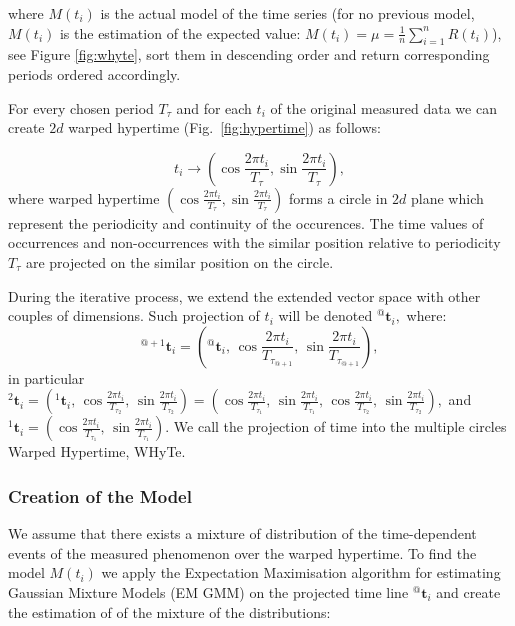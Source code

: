 \noindent where $M\left(t_{i}\right)$ is the actual model of the time series (for no previous model, $M\left(t_{i}\right)$ is the estimation of the expected value: $M\left(t_{i}\right) = \mu = \frac{1}{n} \sum_{i = 1}^{n} R\left(t_{i}\right)$), see Figure \ref{fig:whyte}, sort them in descending order and return corresponding periods ordered accordingly.

For every chosen period $T_{\tau}$ and for each $t_i$ of the original measured data we can create $2d$ warped hypertime (Fig.~\ref{fig:hypertime}) as follows:

\begin{equation}
t_i \rightarrow \left(\cos{\frac{2\pi t_{i}}{T_{\tau}}}, \sin{\frac{2\pi t_{i}}{T_{\tau}}}\right),
\end{equation}
%
where warped hypertime $\left(\cos{\frac{2\pi t_{i}}{T_{\tau}}}, \sin{\frac{2\pi t_{i}}{T_{\tau}}}\right)$ forms a circle in $2d$ plane which represent the periodicity and continuity of the occurences.
The time values of occurrences and non-occurrences with the similar position relative to periodicity $T_{\tau}$ are projected on the similar position on the circle.

During the iterative process, we extend the extended vector space with other couples of dimensions.
Such projection of $t_i$ will be denoted ${}^{@}\mathbf{t}_{i},$ where:
%
\begin{equation}\label{eqn:extension}
    {}^{@+1}\mathbf{t}_{i} = \left({}^{@}\mathbf{t}_{i}, \,\cos{\frac{2\pi t_{i}}{T_{\tau_{@+1}}}}, \, \sin{\frac{2\pi t_{i}}{T_{\tau_{@+1}}}}\right),
\end{equation}
%
in particular ${}^{2}\mathbf{t}_{i} =\left({}^{1}\mathbf{t}_{i}, \,\cos{\frac{2\pi t_{i}}{T_{\tau_2}}}, \, \sin{\frac{2\pi t_{i}}{T_{\tau_2}}}\right) =  \left(\cos{\frac{2\pi t_{i}}{T_{\tau_1}}}, \, \sin{\frac{2\pi t_{i}}{T_{\tau_1}}}, \,\cos{\frac{2\pi t_{i}}{T_{\tau_2}}}, \, \sin{\frac{2\pi t_{i}}{T_{\tau_2}}}\right),$ and
${}^{1}\mathbf{t}_{i} = \left(\cos{\frac{2\pi t_{i}}{T_{\tau_1}}}, \, \sin{\frac{2\pi t_{i}}{T_{\tau_1}}}\right)$.
We call the projection of time into the multiple circles Warped Hypertime, WHyTe.




\subsubsection{Creation of the Model}\label{sec:modelWhyte}

We assume that there exists a mixture of distribution of the time-dependent events of the measured phenomenon over the warped hypertime.
To find the model $M(t_{i})$ we apply the Expectation Maximisation algorithm for estimating Gaussian Mixture Models (EM GMM) on the projected time line ${}^{@}\mathbf{t}_{i}$ and create the estimation of of the mixture of the distributions:

